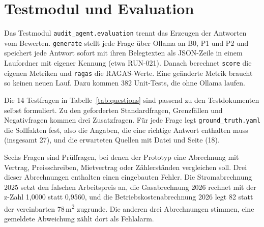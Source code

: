 
\chapter{Testmodul und Evaluation}
\label{chap:05-evaluation}


Das Testmodul \texttt{audit\_agent.evaluation} trennt das Erzeugen der Antworten vom Bewerten. \texttt{generate} stellt jede Frage über Ollama an B0, P1 und P2 und speichert jede Antwort sofort mit ihren Belegtexten als JSON-Zeile in einem Laufordner mit eigener Kennung (etwa RUN-021). Danach berechnet \texttt{score} die eigenen Metriken und \texttt{ragas} die RAGAS-Werte. Eine geänderte Metrik braucht so keinen neuen Lauf. Dazu kommen 382 Unit-Tests, die ohne Ollama laufen.

Die 14 Testfragen in Tabelle~\ref{tab:questions} sind passend zu den Testdokumenten selbst formuliert. Zu den geforderten Standardfragen, Grenzfällen und Negativfragen kommen drei Zusatzfragen. Für jede Frage legt \texttt{ground\_truth.yaml} die Sollfakten fest, also die Angaben, die eine richtige Antwort enthalten muss (insgesamt 27), und die erwarteten Quellen mit Datei und Seite (18).

Sechs Fragen sind Prüffragen, bei denen der Prototyp eine Abrechnung mit Vertrag, Preisschreiben, Mietvertrag oder Zählerständen vergleichen soll. Drei dieser Abrechnungen enthalten einen eingebauten Fehler. Die Stromabrechnung 2025 setzt den falschen Arbeitspreis an, die Gasabrechnung 2026 rechnet mit der z-Zahl 1,0000 statt 0,9560, und die Betriebskostenabrechnung 2026 legt 82 statt der vereinbarten 78\,m\textsuperscript{2} zugrunde. Die anderen drei Abrechnungen stimmen, eine gemeldete Abweichung zählt dort als Fehlalarm.

